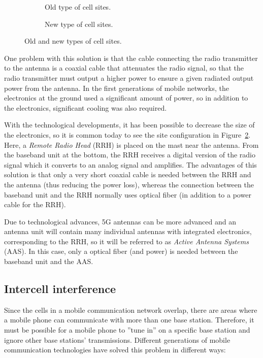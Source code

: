 \begin{figure}[htbp]
\centering
\begin{subfigure}[t]{.45\textwidth}
\centering{}
\caption{\label{fig:site_old}Old type of cell sites.}
\end{subfigure}
\begin{subfigure}[t]{.45\textwidth}
\centering{}
\caption{\label{fig:site_new}New type of cell sites.}
\end{subfigure}
\caption{\label{fig:site}Old and new types of cell sites.}
\end{figure}

One problem with this solution is that the cable connecting the radio transmitter to the antenna is a coaxial cable that attenuates the radio signal, so that the radio transmitter must output a higher power to ensure a given radiated output power from the antenna. In the first generations of mobile networks, the electronics at the ground used a significant amount of power, so in addition to the electronics, significant cooling was also required.

With the technological developments, it has been possible to decrease the size of the electronics, so it is common today to see the site configuration in Figure~\ref{fig:site_new}. Here, a \emph{Remote Radio Head} (RRH) is placed on the mast near the antenna. From the baseband unit at the bottom, the RRH receives a digital version of the radio signal which it converts to an analog signal and amplifies. The advantages of this solution is that only a very short coaxial cable is needed between the RRH and the antenna (thus reducing the power loss), whereas the connection between the baseband unit and the RRH normally uses optical fiber (in addition to a power cable for the RRH).

Due to technological advances, 5G antennas can be more advanced and an antenna unit will contain many individual antennas with integrated electronics, corresponding to the RRH, so it will be referred to as \emph{Active Antenna Systems} (AAS). In this case, only a optical fiber (and power) is needed between the baseband unit and the AAS.
 
\subsection{Intercell interference}
Since the cells in a mobile communication network overlap, there are areas where a mobile phone can communicate with more than one base station. Therefore, it must be possible for a mobile phone to ''tune in'' on a specific base station and ignore other base stations' transmissions. Different generations of mobile communication technologies have solved this problem in different ways:

